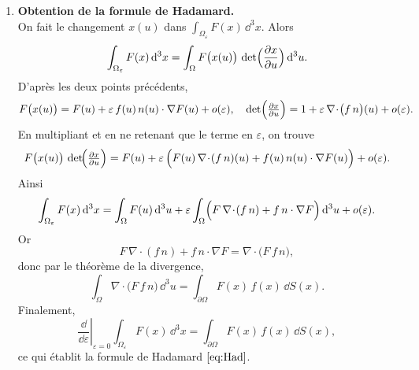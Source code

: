 \documentclass[a4paper,10pt]{report}
\begin{document}
\begin{enumerate}
			\item \textbf{Obtention de la formule de Hadamard.}\\
			On fait le changement \(x(u)\) dans 
			\(\displaystyle \int_{\Omega_\varepsilon} F(x)\,\dd^3x\). 
			Alors 
			\[
			\int_{\Omega_\varepsilon} F(x)\,\dd^3x 
			= \int_{\Omega} F\bigl(x(u)\bigr)\,
			\det\Bigl(\frac{\partial x}{\partial u}\Bigr)\,\dd^3u.
			\]
			D’après les deux points précédents,
			\[
			F\bigl(x(u)\bigr) = F(u) + \varepsilon\,f(u)\,n(u)\cdot\nabla F(u) + o(\varepsilon),
			\quad
			\det\Bigl(\tfrac{\partial x}{\partial u}\Bigr) = 1 + \varepsilon\,\nabla\!\cdot\!\bigl(f\,n\bigr)(u) + o(\varepsilon).
			\]
			En multipliant et en ne retenant que le terme en \(\varepsilon\), on trouve
			\[
			F\bigl(x(u)\bigr)\,\det\!\Bigl(\tfrac{\partial x}{\partial u}\Bigr)
			= F(u) 
			+ \varepsilon\,\Bigl(F(u)\,\nabla\!\cdot\!(f\,n)(u)
			+ f(u)\,n(u)\cdot\nabla F(u)\Bigr)
			+ o(\varepsilon).
			\]
			Ainsi
			\[
			\int_{\Omega_\varepsilon} F(x)\,\dd^3x 
			= \int_{\Omega} F(u)\,\dd^3u
			+ \varepsilon \int_{\Omega} \Bigl(F\,\nabla\!\cdot\!(f\,n)
			+ f\,n\cdot\nabla F\Bigr)\,\dd^3u
			+ o(\varepsilon).
			\]
			Or 
			\[
			F\,\nabla\!\cdot\!(f\,n) + f\,n\cdot\nabla F 
			= \nabla\!\cdot\!\bigl(F\,f\,n\bigr),
			\]
			donc par le théorème de la divergence,
			\[
			\int_{\Omega} \nabla\!\cdot\!\bigl(F\,f\,n\bigr)\,\dd^3u 
			= \int_{\partial \Omega} F(x)\,f(x)\,\dd S(x).
			\]
			Finalement,
			\[
			\left.\frac{\dd}{\dd\varepsilon}\right|_{\varepsilon=0} 
			\int_{\Omega_\varepsilon} F(x)\,\dd^3x 
			= \int_{\partial \Omega} F(x)\,f(x)\,\dd S(x),
			\]
			ce qui établit la formule de Hadamard \(\eqref{eq:Had}\).
			
		\end{enumerate}
		
\end{document}
